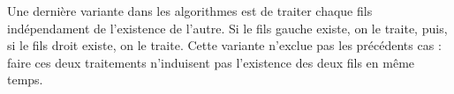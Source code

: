 \documentclass[11pt,a4paper]{article}
\begin{document}
\begin{table}[ht!]
\begin{minipage}{0.18\textwidth}
  \end{minipage}
  \hfillx
  \begin{minipage}{0.18\textwidth}


  \end{minipage}
\end{table}


\bigskip

Une dernière variante dans les algorithmes est de traiter chaque fils indépendament de l'existence de l'autre.
Si le fils gauche existe, on le traite, puis, si le fils droit existe, on le traite.
Cette variante n'exclue pas les précédents cas : faire ces deux traitements n'induisent pas l'existence des deux fils en même temps.
\end{document}
